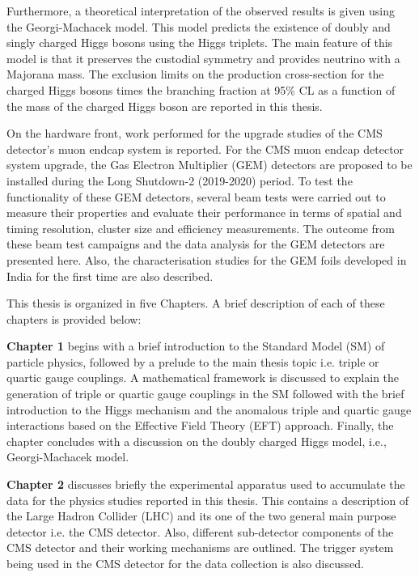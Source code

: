 Furthermore, a theoretical interpretation of the observed results is given using the Georgi-Machacek model. This model predicts the existence of doubly and singly charged Higgs bosons using the Higgs triplets. The main feature of this model is that it preserves the custodial symmetry and provides neutrino with a Majorana mass. The exclusion limits on the production cross-section for the charged Higgs bosons times the branching fraction at 95\% CL as a function of the mass of the charged Higgs boson are reported in this thesis.

On the hardware front, work performed for the upgrade studies of the CMS detector's muon endcap system is reported. For the CMS muon endcap detector system upgrade, the Gas Electron Multiplier (GEM) detectors are proposed to be installed during the Long Shutdown-2 (2019-2020) period. To test the functionality of these GEM detectors, several beam tests were carried out to measure their properties and evaluate their performance in terms of spatial and timing resolution, cluster size and efficiency measurements. The outcome from these beam test campaigns and the data analysis for the GEM detectors are presented here. Also, the characterisation studies for the GEM foils developed in India for the first time are also described.

This thesis is organized in five Chapters. A brief description of each of these chapters is provided below:

\textbf{Chapter 1} begins with a brief introduction to the Standard Model (SM) of particle physics, followed by a prelude to the main thesis topic i.e. triple or quartic gauge couplings. A mathematical framework is discussed to explain the generation of triple or quartic gauge couplings in the SM followed with the brief introduction to the Higgs mechanism and the anomalous triple and quartic gauge interactions based on the Effective Field Theory (EFT) approach. Finally, the chapter concludes with a discussion on the doubly charged Higgs model, i.e., Georgi-Machacek model.

\textbf{Chapter 2} discusses briefly the experimental apparatus used to accumulate the data for the physics studies reported in this thesis. This contains a description of the Large Hadron Collider (LHC) and its one of the two general main purpose detector i.e. the CMS detector. Also, different sub-detector components of the CMS detector and their working mechanisms are outlined. The trigger system being used in the CMS detector for the data collection is also discussed.

